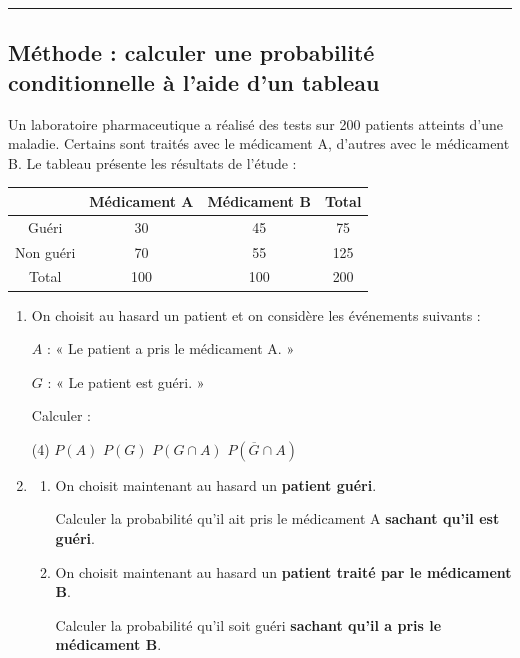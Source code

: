\documentclass{article}
\theoremstyle{definition}
\begin{document}
\pagestyle{empty}


\large


{
  \normalsize
  \textbf{\Niveau} \hfill \textbf{\ChapitreCourt} \hfill \textbf{\Document}
}
\vspace{0.5em}
\hrule

\subsection*{Méthode : calculer une probabilité conditionnelle à l'aide d'un tableau}

\noindent

Un laboratoire pharmaceutique a réalisé des tests sur 200 patients atteints d'une maladie.
Certains sont traités avec le médicament A, d'autres avec le médicament B.
Le tableau présente les résultats de l'étude :

\begin{center}
\renewcommand{\arraystretch}{1.5}
\begin{tabular}{|c|c|c|c|}
\hline
 & Médicament A & Médicament B & Total \\
\hline
Guéri & 30 & 45 & 75 \\
\hline
Non guéri & 70 & 55 & 125 \\
\hline
Total & 100 & 100 & 200 \\
\hline
\end{tabular}
\end{center}

\begin{enumerate}
    \item On choisit au hasard un patient et on considère les événements suivants :

    $A$ : « Le patient a pris le médicament A. »

    $G$ : « Le patient est guéri. »

    Calculer :
    \begin{tasks}(4)
        \task $P(A)$
        \task $P(G)$
        \task $P(G \cap A)$
        \task $P(\overline{G} \cap A)$
    \end{tasks}

    \item
    \begin{enumerate}
        \item On choisit maintenant au hasard un \textbf{patient guéri}.
        
        Calculer la probabilité qu'il ait pris le médicament A \textbf{sachant qu'il est guéri}.

        \item On choisit maintenant au hasard un \textbf{patient traité par le médicament B}.
        
        Calculer la probabilité qu'il soit guéri \textbf{sachant qu'il a pris le médicament B}.
    \end{enumerate}
\end{enumerate}
\end{document}
